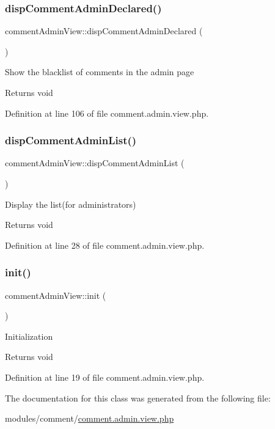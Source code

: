 \subsubsection{\texorpdfstring{disp\+Comment\+Admin\+Declared()}{dispCommentAdminDeclared()}}
{\footnotesize\ttfamily comment\+Admin\+View\+::disp\+Comment\+Admin\+Declared (\begin{DoxyParamCaption}{ }\end{DoxyParamCaption})}

Show the blacklist of comments in the admin page \begin{DoxyReturn}{Returns}
void 
\end{DoxyReturn}


Definition at line 106 of file comment.\+admin.\+view.\+php.

\mbox{\label{classcommentAdminView_a979a3095a55ec0e9356db470c6425639}} 
\subsubsection{\texorpdfstring{disp\+Comment\+Admin\+List()}{dispCommentAdminList()}}
{\footnotesize\ttfamily comment\+Admin\+View\+::disp\+Comment\+Admin\+List (\begin{DoxyParamCaption}{ }\end{DoxyParamCaption})}

Display the list(for administrators) \begin{DoxyReturn}{Returns}
void 
\end{DoxyReturn}


Definition at line 28 of file comment.\+admin.\+view.\+php.

\mbox{\label{classcommentAdminView_a61733eebabe2434e133bbd516d8f68c5}} 
\subsubsection{\texorpdfstring{init()}{init()}}
{\footnotesize\ttfamily comment\+Admin\+View\+::init (\begin{DoxyParamCaption}{ }\end{DoxyParamCaption})}

Initialization \begin{DoxyReturn}{Returns}
void 
\end{DoxyReturn}


Definition at line 19 of file comment.\+admin.\+view.\+php.



The documentation for this class was generated from the following file\+:\begin{DoxyCompactItemize}
\item 
modules/comment/\hyperlink{comment_8admin_8view_8php}{comment.\+admin.\+view.\+php}\end{DoxyCompactItemize}
